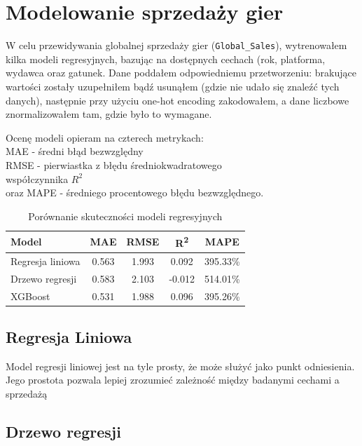 \documentclass[11pt]{article}
\begin{document}
\section{Modelowanie sprzedaży gier}\label{sec:modelowanie-sprzedazy-gier}

W celu przewidywania globalnej sprzedaży gier (\texttt{Global\_Sales}),
wytrenowałem kilka modeli regresyjnych, bazując na dostępnych cechach (rok, platforma, wydawca oraz gatunek.
Dane poddałem odpowiedniemu przetworzeniu: brakujące wartości zostały uzupełniłem bądź usunąłem (gdzie nie udało się znaleźć tych danych),
następnie przy użyciu one-hot encoding zakodowałem, a dane liczbowe znormalizowałem tam, gdzie było to wymagane.

Ocenę modeli opieram na czterech metrykach:\\
MAE - średni błąd bezwzględny\\
RMSE - pierwiastka z błędu średniokwadratowego\\
współczynnika \( R^2 \)\\
oraz MAPE - średniego procentowego błędu bezwzględnego.

\begin{table}[H]
\centering
\begin{tabular}{|l|c|c|c|c|}
\hline
\textbf{Model} & \textbf{MAE} & \textbf{RMSE} & \textbf{R\textsuperscript{2}} & \textbf{MAPE} \\
\hline
Regresja liniowa & 0.563 & 1.993 & 0.092 & 395.33\% \\
Drzewo regresji  & 0.583 & 2.103 & -0.012 & 514.01\% \\
XGBoost          & 0.531 & 1.988 & 0.096 & 395.26\% \\
\hline
\end{tabular}
\caption{Porównanie skuteczności modeli regresyjnych}
\label{tab:model_comparison}
\end{table}




\subsection{Regresja Liniowa}\label{subsec:regresja-liniowa}

Model regresji liniowej jest na tyle prosty, że może służyć jako punkt odniesienia.
Jego prostota pozwala lepiej zrozumieć zależność między badanymi cechami a sprzedażą

\subsection{Drzewo regresji}\label{subsec:drzewo-regresji}
\end{document}
